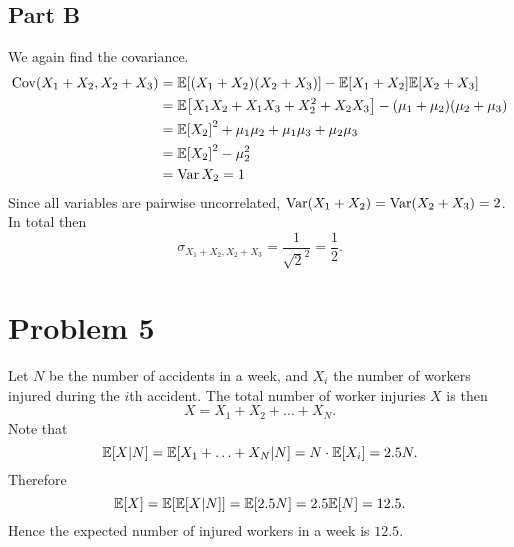 \documentclass{eeleyes}
\begin{document}
\subsection*{Part B}
We again find the covariance.
\begin{align*}
    \operatorname{Cov}(X_1 + X_2, X_2 + X_3) &= \expp{(X_1 + X_2)(X_2 + X_3)} - \expp{X_1 + X_2} \expp{X_2 + X_3} \\
                                             &= \expp{X_1 X_2 + X_1 X_3 + X_2^2 + X_2 X_3} - (\mu_1 + \mu_2) (\mu_2 + \mu_3) \\
                                             &= \expp{X_2}^2 + \mu_1 \mu_2 + \mu_1 \mu_3 + \mu_2 \mu_3 \\
                                             &= \expp{X_2}^2 - \mu_2^2 \\
                                             &= \varr X_2 = 1
\end{align*}
Since all variables are pairwise uncorrelated, $\operatorname{Var}(X_1 + X_2) = \operatorname{Var}(X_2 + X_3) = 2$. In total then
\[
    \sigma_{X_1 + X_2, X_2 + X_3} = \frac{1}{\sqrt{2}^2} = \frac{1}{2}
.\]

\section*{Problem 5}
Let $N$ be the number of accidents in a week, and $X_i$ the number of workers injured during the $i$th accident. The total number of worker injuries $X$ is then
\[
    X = X_1 + X_2 + \ldots + X_N
.\]
Note that
\[
    \expp{X | N} = \expp{X_1 + \ldots + X_N | N} = N \cdot \expp{X_i} = 2.5 N
.\]
Therefore
\[
    \expp{X} = \expp{\expp{X | N}} = \expp{2.5 N} = 2.5 \expp{N} = 12.5
.\]
Hence the expected number of injured workers in a week is $12.5$.
\end{document}

